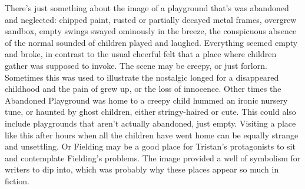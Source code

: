 \documentclass[12pt]{book}
\begin{document}
There's just something about the image of a playground that's was abandoned and neglected: chipped paint, rusted or partially decayed metal frames, overgrew sandbox, empty swings swayed ominously in the breeze, the conspicuous absence of the normal sounded of children played and laughed. Everything seemed empty and broke, in contrast to the usual cheerful felt that a place where children gather was supposed to invoke. The scene may be creepy, or just forlorn. Sometimes this was used to illustrate the nostalgic longed for a disappeared childhood and the pain of grew up, or the loss of innocence. Other times the Abandoned Playground was home to a creepy child hummed an ironic nursery tune, or haunted by ghost children, either stringy-haired or cute. This could also include playgrounds that aren't actually abandoned, just empty. Visiting a place like this after hours when all the children have went home can be equally strange and unsettling. Or Fielding may be a good place for Tristan's protagonists to sit and contemplate Fielding's problems. The image provided a well of symbolism for writers to dip into, which was probably why these places appear so much in fiction.
\end{document}
